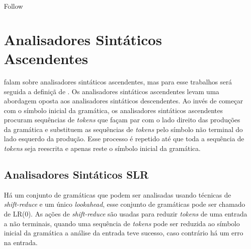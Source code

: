 \begin{algorithm}[htp]
    \caption{Follow}\label{alg:follow}
\end{algorithm}

\section{Analisadores Sintáticos Ascendentes}
\textcite{cooper2022engineering,mogensen2024introduction, thain2020introduction} falam sobre analisadores sintáticos ascendentes, mas para esse trabalhos será seguida a definiçã de \textcite{thain2020introduction}. Os analisadores sintáticos ascendentes levam uma abordagem oposta aos analisadores sintáticos descendentes. Ao invés de começar com o símbolo inicial da gramática, os analisadores sintáticos ascendentes procuram sequências de \textit{tokens} que façam par com o lado direito das produções da gramática e substituem as sequências de \textit{tokens} pelo símbolo não terminal do lado esquerdo da produção. Esse processo é repetido até que toda a sequência de \textit{tokens} seja reescrita e apenas reste o símbolo inicial da gramática.

\subsection{Analisadores Sintáticos SLR}
Há um conjunto de gramáticas que podem ser analisadas usando técnicas de \textit{shift-reduce} e um único \textit{lookahead}, esse conjunto de gramáticas pode ser chamado de LR(0). As ações de \textit{shift-reduce} são usadas para reduzir \textit{tokens} de uma entrada a não terminais, quando uma sequência de \textit{tokens} pode ser reduzida ao símbolo inicial da gramática a análise da entrada teve sucesso, caso contrário há um erro na entrada.


